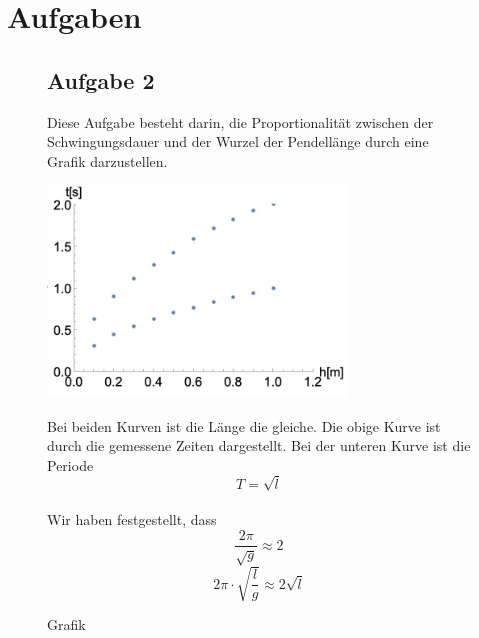 \documentclass[12pt, a4paper, twoside]{article}
\begin{document}
    \section{Aufgaben}
    \begin{figure}[h]
        \subsection{Aufgabe 2}
        Diese Aufgabe besteht darin, die Proportionalität zwischen der Schwingungsdauer und der Wurzel der Pendellänge durch eine Grafik darzustellen.
        \begin{center}
            \includegraphics[width=8cm]{aufgabe2.png}
            \caption{Grafik}
        \end{center}
        Bei beiden Kurven ist die Länge die gleiche. Die obige Kurve ist durch die gemessene Zeiten dargestellt. Bei der unteren Kurve ist die Periode 
        \[T = \sqrt{l}\]
        \\Wir haben festgestellt, dass 
        \[\frac{2\pi}{\sqrt{g}} \approx 2\]
        \[2\pi \cdot \sqrt{\frac{l}{g}} \approx 2\sqrt{l}\]
    \end{figure}
\end{document}
